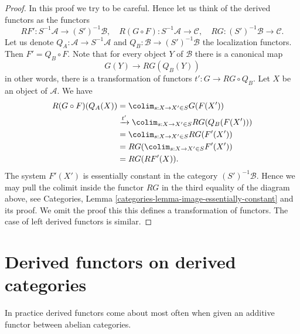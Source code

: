 \begin{proof}
In this proof we try to be careful. Hence let us think of
the derived functors as the functors
$$
RF' : S^{-1}\mathcal{A} \to (S')^{-1}\mathcal{B}, \quad
R(G \circ F) : S^{-1}\mathcal{A} \to \mathcal{C}, \quad
RG : (S')^{-1}\mathcal{B} \to \mathcal{C}.
$$
Let us denote
$Q_A : \mathcal{A} \to S^{-1}\mathcal{A}$ and
$Q_B : \mathcal{B} \to (S')^{-1}\mathcal{B}$
the localization functors. Then $F' = Q_B \circ F$. Note that for
every object $Y$ of $\mathcal{B}$ there is a canonical map
$$
G(Y) \longrightarrow RG(Q_B(Y))
$$
in other words, there is a transformation of functors
$t' : G \to RG \circ Q_B$. Let $X$ be an object of $\mathcal{A}$.
We have
\begin{align*}
R(G \circ F)(Q_A(X))
& = \colim_{s : X \to X' \in S} G(F(X')) \\
& \xrightarrow{t'} \colim_{s : X \to X' \in S} RG(Q_B(F(X'))) \\
& = \colim_{s : X \to X' \in S} RG(F'(X')) \\
& = RG(\colim_{s : X \to X' \in S} F'(X')) \\
& = RG(RF'(X)).
\end{align*}
The system $F'(X')$ is essentially constant in the category
$(S')^{-1}\mathcal{B}$. Hence we may pull the colimit inside the
functor $RG$ in the third equality of the diagram above, see
Categories, Lemma \ref{categories-lemma-image-essentially-constant}
and its proof. We omit the proof this this defines a transformation
of functors. The case of left derived functors is similar.
\end{proof}




\section{Derived functors on derived categories}
\label{section-derived-functors-classical}

\noindent
In practice derived functors come about most often when given an
additive functor between abelian categories.


